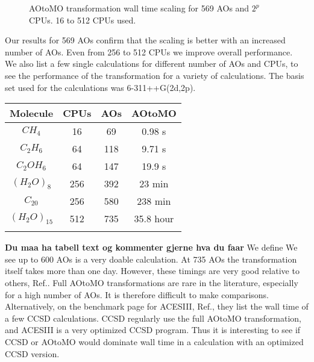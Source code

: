 \begin{figure}[h!]
\begin{center}
\caption{AOtoMO transformation wall time scaling for 569 AOs and $2^p$ CPUs. 16 to 512 CPUs used. }
\label{fig:aotomo2}
\end{center}
\end{figure}

Our results for 569 AOs confirm that the scaling is better with
an increased number of AOs. Even from 256 to 512 CPUs we improve overall
performance.  \\

We also list a few single calculations for different number of AOs and
CPUs, to see the performance of the transformation for a variety of
calculations. The basis set used for the calculations was
6-311++G(2d,2p). \\

  \begin{center}
  \begin{tabular}{ c c c c }
  \hline
     Molecule & CPUs & AOs & AOtoMO \\ \hline
     $CH_4$ & 16 & 69 & 0.98 s \\
     $C_2H_6$ & 64 & 118 & 9.71 s \\
     $C_2 O H_6$ & 64 & 147 & 19.9 s \\
     $\left(H_2O\right)_8$ & 256 & 392 & 23 min \\
     $C_{20}$ & 256 & 580 & 238 min \\
     $\left(H_2O\right)_{15}$ & 512 & 735 & 35.8 hour \\
     \hline \\
  \end{tabular} 
\end{center} 
{\bf Du maa ha tabell text og kommenter gjerne hva du faar} We define
We see up to 600 AOs is a very doable calculation. At 735 AOs the
transformation itself takes more than one day. However, these timings
are very good relative to others, Ref.\cite{aotomo_2_cite}. Full
AOtoMO transformations are rare in the literature, especially for a high
number of AOs. It is therefore difficult to make comparisons. \\

Alternatively, on the benchmark page for ACESIII,
Ref.\cite{aces_non_ref}, they list the wall time of a few CCSD
calculations. CCSD regularly use the full AOtoMO transformation, and
ACESIII is a very optimized CCSD program. Thus it is interesting to
see if CCSD or AOtoMO would dominate wall time in a calculation with
an optimized CCSD version. \\

